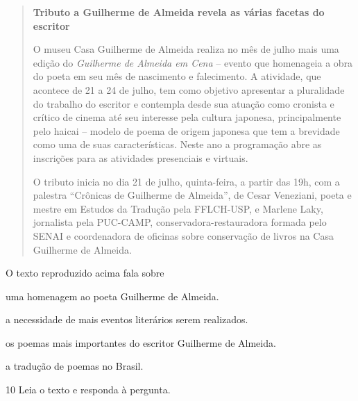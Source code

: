 \begin{quote}
\textbf{Tributo a Guilherme de Almeida revela as várias facetas do 
escritor}

O museu Casa Guilherme de Almeida realiza no mês de julho mais uma
edição do \textit{Guilherme de Almeida em Cena} -- evento que homenageia a obra
do poeta em seu mês de nascimento e falecimento. A atividade, que
acontece de 21 a 24 de julho, tem como objetivo apresentar a pluralidade
do trabalho do escritor e contempla desde sua atuação como cronista e
crítico de cinema até seu interesse pela cultura japonesa,
principalmente pelo haicai -- modelo de poema de origem japonesa que tem
a brevidade como uma de suas características. Neste ano a programação
abre as inscrições para as atividades presenciais e virtuais.

O tributo inicia no dia 21 de julho, quinta-feira, a partir das 19h, com
a palestra ``Crônicas de Guilherme de Almeida'', de Cesar Veneziani,
poeta e mestre em Estudos da Tradução pela FFLCH-USP, e Marlene Laky,
jornalista pela PUC-CAMP, conservadora-restauradora formada pelo SENAI e
coordenadora de oficinas sobre conservação de livros na Casa Guilherme
de Almeida.

\end{quote}

O texto reproduzido acima fala sobre

\begin{escolha}
  \item uma homenagem ao poeta Guilherme de Almeida.

  \item a necessidade de mais eventos literários serem realizados.

  \item os poemas mais importantes do escritor Guilherme de Almeida.

  \item a tradução de poemas no Brasil.
\end{escolha}


\num{10} Leia o texto e responda à pergunta.

